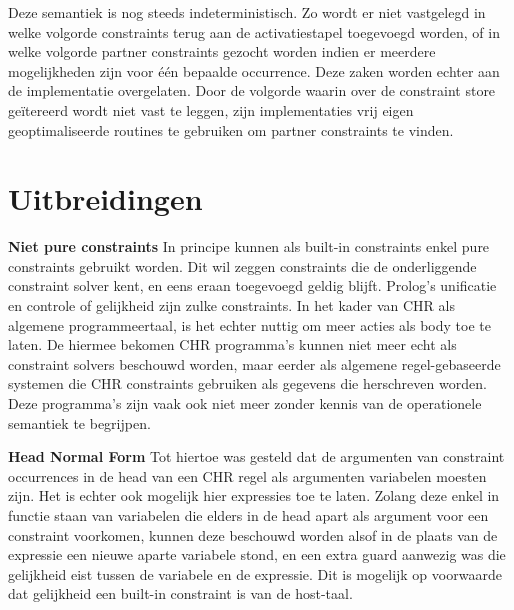 Deze semantiek is nog steeds indeterministisch. Zo wordt er niet vastgelegd in welke volgorde constraints terug aan de activatiestapel toegevoegd worden, of in welke volgorde partner constraints gezocht worden indien er meerdere mogelijkheden zijn voor \'e\'en bepaalde occurrence. Deze zaken worden echter aan de implementatie overgelaten. Door de volgorde waarin over de constraint store ge\"itereerd wordt niet vast te leggen, zijn implementaties vrij eigen geoptimaliseerde routines te gebruiken om partner constraints te vinden.

\section{Uitbreidingen}

{\bf Niet pure constraints} In principe kunnen als built-in constraints enkel pure constraints gebruikt worden. Dit wil zeggen constraints die de onderliggende constraint solver kent, en eens eraan toegevoegd geldig blijft. Prolog's unificatie en controle of gelijkheid zijn zulke constraints. In het kader van CHR als algemene programmeertaal, is het echter nuttig om meer acties als body toe te laten. De hiermee bekomen CHR programma's kunnen niet meer echt als constraint solvers beschouwd worden, maar eerder als algemene regel-gebaseerde systemen die CHR constraints gebruiken als gegevens die herschreven worden. Deze programma's zijn vaak ook niet meer zonder kennis van de operationele semantiek te begrijpen.

{\bf Head Normal Form} Tot hiertoe was gesteld dat de argumenten van constraint occurrences in de head van een CHR regel als argumenten variabelen moesten zijn. Het is echter ook mogelijk hier expressies toe te laten. Zolang deze enkel in functie staan van variabelen die elders in de head apart als argument voor een constraint voorkomen, kunnen deze beschouwd worden alsof in de plaats van de expressie een nieuwe aparte variabele stond, en een extra guard aanwezig was die gelijkheid eist tussen de variabele en de expressie. Dit is mogelijk op voorwaarde dat gelijkheid een built-in constraint is van de host-taal.

